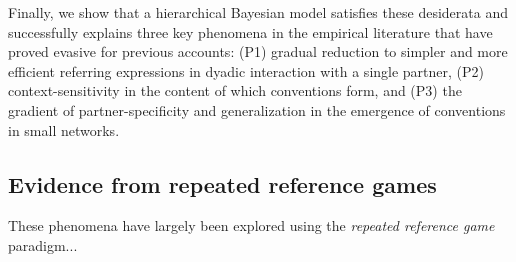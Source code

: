 Finally, we show that a hierarchical Bayesian model satisfies these desiderata and successfully explains three key phenomena in the empirical literature that have proved evasive for previous accounts: (P1) gradual reduction to simpler and more efficient referring expressions in dyadic interaction with a single partner, (P2) context-sensitivity in the content of which conventions form, and (P3) the gradient of partner-specificity and generalization in the emergence of conventions in small networks.


\subsection{Evidence from repeated reference games}

These phenomena have largely been explored using the \emph{repeated reference game} paradigm...

